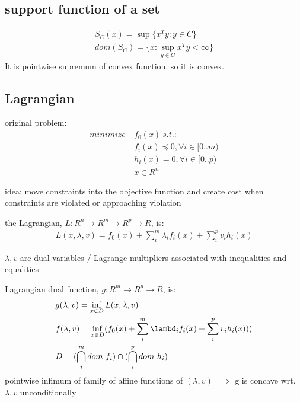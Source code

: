 \documentclass[8pt]{extarticle}
\newcommand{\norm}[1]{\|#1\|}
\newcommand{\set}[1]{\{#1\}}
\begin{document}
\begin{multicols*}{2}
    
  
  \subsection{support function of a set}
  \begin{align*}
    S_C(x) = \sup \set{x^T y : y \in C}\\
    dom(S_C) = \set{x: \sup_{y\in C} x^Ty < \infty}
  \end{align*}
  It is pointwise supremum of convex function, so it is convex.


  \subsection{Lagrangian}
  original problem:
  \begin{align*}
    minimize\ &f_0(x)\ s.t.:\\
    &f_i(x) \preceq 0, \forall i \in [0..m)\\
    &h_i(x) = 0, \forall i \in [0..p)\\
    &x \in R^n
  \end{align*}

  idea: move constraints into the objective function and create cost when constraints are violated or approaching violation
  
  the Lagrangian, $L: R^n \rightarrow R^m \rightarrow R^p \rightarrow R$, is:
  \begin{align*}
    L(x,\lambda, v) = f_0(x) + \sum_i^m \lambda_i f_i(x) + \sum_i^p v_i h_i(x)
  \end{align*}

  $\lambda, v$ are dual variables / Lagrange multipliers associated with inequalities and equalities

  Lagrangian dual function, $g: R^m \rightarrow R^p \rightarrow R$, is:
  \begin{align*}
    &g(\lambda, v) = \inf_{x \in D} L(x,\lambda,v)\\
    &f(\lambda, v) = \inf_{x \in D} (f_0(x) + \sum_i^m \lambd_i f_i(x) + \sum_i^p v_i h_i(x)))\\
    &D = (\bigcap_i^m dom\ f_i) \cap (\bigcap_i^p dom\ h_i)
  \end{align*}
  pointwise infimum of family of affine functions of $(\lambda, v)$ $\implies$ g is concave wrt. $\lambda, v$ unconditionally


\end{multicols*}
\end{document}
